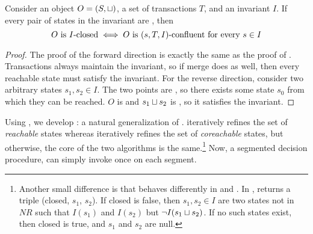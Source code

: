 \begin{theorem}
  Consider an object $O = (S, \sqcup)$, a set of transactions $T$, and an
  invariant $I$. If every pair of states in the invariant are \TIcoreachable{},
  then
  \[
    \text{$O$ is $I$-closed{}}
    \iff
    \text{$O$ is $(s, T, I)$-confluent for every $s \in I$}
  \]
\end{theorem}
\begin{proof}
  The proof of the forward direction is exactly the same as the proof of
  . Transactions always maintain the
  invariant, so if merge does as well, then every reachable state must satisfy
  the invariant.
  For the reverse direction, consider two arbitrary states $s_1, s_2 \in I$.
  The two points are \TIcoreachable{}, so there exists some state $s_0$ from
  which they can be reached. $O$ is \sTIconfluent{} and $s_1 \sqcup s_2$ is
  \sTIreachable{}, so it satisfies the invariant.
\end{proof}

Using , we develop
: a natural generalization
of .
 iteratively refines the set of
\emph{reachable} states whereas
 iteratively refines the
set of \emph{coreachable} states, but otherwise, the core of the two algorithms
is the same.\footnote{%
  Another small difference is that \IsIclosed{} behaves differently in
   and
  . In
  , \IsIclosed{} returns a
  triple (closed, $s_1$, $s_2$). If closed is false, then $s_1, s_2 \in I$
  are two states not in $NR$ such that $I(s_1)$ and $I(s_2)$ but $\lnot I(s_1
  \sqcup s_2)$. If no such states exist, then closed is true, and $s_1$ and
  $s_2$ are null.
}
Now, a segmented \invariantconfluence{} decision procedure, can simply invoke
 once on each segment.

